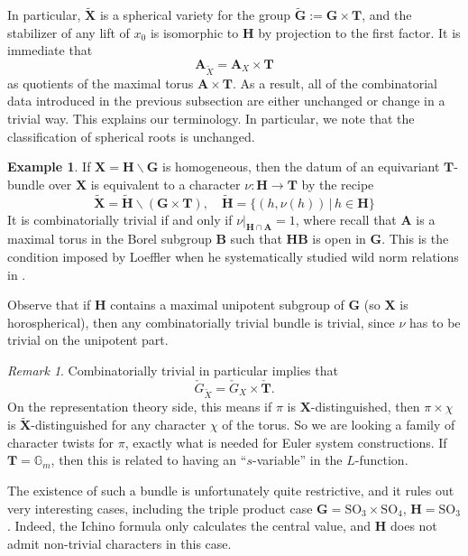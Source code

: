 \documentclass{amsart}
\theoremstyle{definition}
\newtheorem{example}[theorem]{Example}
\theoremstyle{remark}
\newtheorem{remark}[theorem]{Remark}
\newcommand{\1}{\mathbf{1}}
\newcommand{\G}{\mathbf{G}}
\newcommand{\mb}[1]{\mathbf{#1}}
\theoremstyle{definition}
\renewcommand{\G}{\mathbb{G}}
\newcommand{\bH}{\mathbf{H}}
\newcommand{\bG}{\mathbf{G}}
\begin{document}
In particular, $\widetilde{\mb{X}}$ is a spherical variety for the group $\widetilde{\bG}:=\mb{G}\times\mb{T}$, and the stabilizer of any lift of $x_0$ is isomorphic to $\mb{H}$ by projection to the first factor. It is immediate that
\[
  \mb{A}_{\widetilde{X}}=\mb{A}_{X}\times\mb{T}
\]
as quotients of the maximal torus $\mb{A}\times\mb{T}$. As a result, all of the combinatorial data introduced in the previous subsection are either unchanged or change in a trivial way. This explains our terminology. In particular, we note that the classification of spherical roots is unchanged.

\begin{example}\label{ex:CombTriv}
  If $\mb{X}=\mb{H}\backslash\mb{G}$ is homogeneous, then the datum of an equivariant $\mb{T}$-bundle over $\mb{X}$ is equivalent to a character $\nu:\mb{H}\to\mb{T}$ by the recipe
  \[
    \widetilde{\mb{X}}=\widetilde{\mb{H}}\backslash(\mb{G}\times\mb{T}),\quad \widetilde{\bH}=\{(h,\nu(h))\,|\,h\in\mb{H}\}
  \]
  It is combinatorially trivial if and only if $\nu|_{\mb{H}\cap\mb{A}}=1$, where recall that $\mb{A}$ is a maximal torus in the Borel subgroup $\mb{B}$ such that $\mb{H}\mb{B}$ is open in $\mb{G}$. This is the condition imposed by Loeffler when he systematically studied wild norm relations in \cite[\S 4.6]{LoefflerSpherical}.

  Observe that if $\mb{H}$ contains a maximal unipotent subgroup of $\mb{G}$ (so $\mb{X}$ is horospherical), then any combinatorially trivial bundle is trivial, since $\nu$ has to be trivial on the unipotent part.
\end{example}

\begin{remark}\label{rmk:CombTriv}
  Combinatorially trivial in particular implies that
  \[
    \check{G}_{\widetilde{X}}=\check{G}_{X}\times\check{\mb{T}}.
  \]
  On the representation theory side, this means if $\pi$ is $\mb{X}$-distinguished, then $\pi\times\chi$ is $\widetilde{\mb{X}}$-distinguished for any character $\chi$ of the torus. So we are looking a family of character twists for $\pi$, exactly what is needed for Euler system constructions. If $\mb{T}=\G_m$, then this is related to having an ``$s$-variable'' in the $L$-function.
  
  The existence of such a bundle is unfortunately quite restrictive, and it rules out very interesting cases, including the triple product case $\mb{G}=\mathrm{SO}_3\times\mathrm{SO}_4$, $\mb{H}=\mathrm{SO}_3$. Indeed, the Ichino formula only calculates the central value, and $\mb{H}$ does not admit non-trivial characters in this case.
\end{remark}
\end{document}
